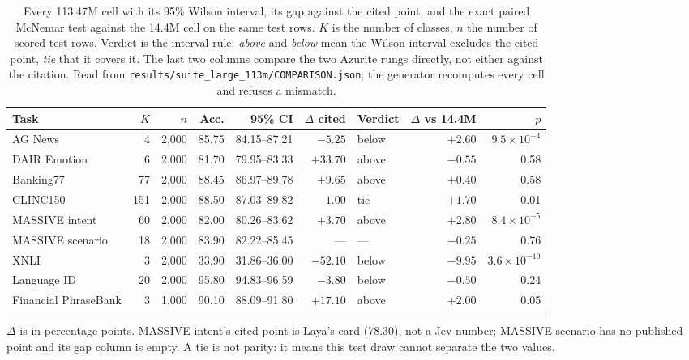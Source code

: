 \begin{table}[htbp]
\centering
\footnotesize
\caption{Every 113.47M cell with its 95\% Wilson interval, its gap against the
cited point, and the exact paired McNemar test against the 14.4M cell on the same
test rows. $K$ is the number of classes, $n$ the number of scored test rows.
Verdict is the interval rule: \emph{above} and \emph{below} mean the Wilson
interval excludes the cited point, \emph{tie} that it covers it. The last two
columns compare the two Azurite rungs directly, not either against the citation.
Read from \texttt{results/suite\_large\_113m/COMPARISON.json}; the generator
recomputes every cell and refuses a mismatch.}
\label{tab:suite-ci}
\setlength{\tabcolsep}{2.5pt}
\begin{tabular}{@{}lrrrrrlrr@{}}
\toprule
Task & $K$ & $n$ & Acc. & 95\% CI & $\Delta$ cited & Verdict &
$\Delta$ vs 14.4M & $p$ \\
\midrule
AG News & 4 & 2,000 & 85.75 & 84.15--87.21 & $-5.25$ & below & $+2.60$ & $9.5\times10^{-4}$ \\
DAIR Emotion & 6 & 2,000 & 81.70 & 79.95--83.33 & $+33.70$ & above & $-0.55$ & 0.58 \\
Banking77 & 77 & 2,000 & 88.45 & 86.97--89.78 & $+9.65$ & above & $+0.40$ & 0.58 \\
CLINC150 & 151 & 2,000 & 88.50 & 87.03--89.82 & $-1.00$ & tie & $+1.70$ & 0.01 \\
MASSIVE intent & 60 & 2,000 & 82.00 & 80.26--83.62 & $+3.70$ & above & $+2.80$ & $8.4\times10^{-5}$ \\
MASSIVE scenario & 18 & 2,000 & 83.90 & 82.22--85.45 & --- & --- & $-0.25$ & 0.76 \\
XNLI & 3 & 2,000 & 33.90 & 31.86--36.00 & $-52.10$ & below & $-9.95$ & $3.6\times10^{-10}$ \\
Language ID & 20 & 2,000 & 95.80 & 94.83--96.59 & $-3.80$ & below & $-0.50$ & 0.24 \\
Financial PhraseBank & 3 & 1,000 & 90.10 & 88.09--91.80 & $+17.10$ & above & $+2.00$ & 0.05 \\
\bottomrule
\end{tabular}
\par\smallskip
\footnotesize
$\Delta$ is in percentage points. MASSIVE intent's cited point is Laya's card
(78.30), not a Jev number;
MASSIVE scenario has no published point and its gap column is empty. A tie is not
parity: it means this test draw cannot separate the two values.
\end{table}
